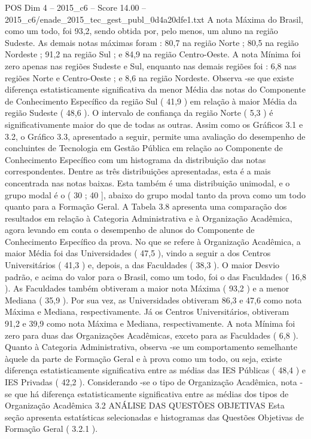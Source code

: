 \begin{textsample}{POS Dim 4 – 2015\_c6 – Score 14.00 – 2015\_c6/enade\_2015\_tec\_gest\_publ\_0d4a20dfe1.txt}
A nota Máxima do Brasil, como um todo, foi 93,2, sendo obtida por, pelo menos, um aluno na região Sudeste.
As demais notas máximas foram : 80,7 na região Norte ; 80,5 na região Nordeste ; 91,2 na região Sul ; e 84,9 na região Centro-Oeste.
A nota Mínima foi zero apenas nas regiões Sudeste e Sul, enquanto nas demais regiões foi : 6,8 nas regiões Norte e Centro-Oeste ; e 8,6 na região Nordeste.
Observa -se que existe diferença estatisticamente significativa da menor Média das notas do Componente de Conhecimento Específico da região Sul ( 41,9 ) em relação à maior Média da região Sudeste ( 48,6 ).
O intervalo de confiança da região Norte ( 5,3 ) é significativamente maior do que de todas as outras.
Assim como os Gráficos 3.1 e 3.2, o Gráfico 3.3, apresentado a seguir, permite uma avaliação do desempenho de concluintes de Tecnologia em Gestão Pública em relação ao Componente de Conhecimento Específico com um histograma da distribuição das notas correspondentes.
Dentre as três distribuições apresentadas, esta é a mais concentrada nas notas baixas.
Esta também é uma distribuição unimodal, e o grupo modal é o ( 30 ; 40 ], abaixo do grupo modal tanto da prova como um todo quanto para a Formação Geral.
A Tabela 3.8 apresenta uma comparação dos resultados em relação à Categoria Administrativa e à Organização Acadêmica, agora levando em conta o desempenho de alunos do Componente de Conhecimento Específico da prova.
No que se refere à Organização Acadêmica, a maior Média foi das Universidades ( 47,5 ), vindo a seguir a dos Centros Universitários ( 41,3 ) e, depois, a das Faculdades ( 38,3 ).
O maior Desvio padrão, e acima do valor para o Brasil, como um todo, foi o das Faculdades ( 16,8 ).
As Faculdades também obtiveram a maior nota Máxima ( 93,2 ) e a menor Mediana ( 35,9 ).
Por sua vez, as Universidades obtiveram 86,3 e 47,6 como nota Máxima e Mediana, respectivamente.
Já os Centros Universitários, obtiveram 91,2 e 39,9 como nota Máxima e Mediana, respectivamente.
A nota Mínima foi zero para duas das Organizações Acadêmicas, exceto para as Faculdades ( 6,8 ).
Quanto à Categoria Administrativa, observa -se um comportamento semelhante àquele da parte de Formação Geral e à prova como um todo, ou seja, existe diferença estatisticamente significativa entre as médias das IES Públicas ( 48,4 ) e IES Privadas ( 42,2 ).
Considerando -se o tipo de Organização Acadêmica, nota -se que há diferença estatisticamente significativa entre as médias dos tipos de Organização Acadêmica 3.2 ANÁLISE DAS QUESTÕES OBJETIVAS Esta seção apresenta estatísticas selecionadas e histogramas das Questões Objetivas de Formação Geral ( 3.2.1 ).

\end{textsample}
